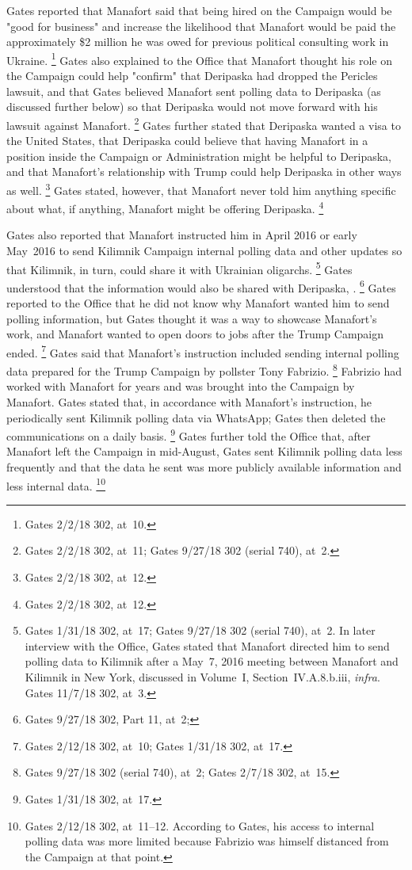 Gates reported that Manafort said that being hired on the Campaign would be "good for business" and increase the likelihood that Manafort would be paid the approximately \$2 million he was owed for previous political consulting work in Ukraine.%
\footnote{Gates 2/2/18 302, at~10.}
Gates also explained to the Office that Manafort thought his role on the Campaign could help "confirm" that Deripaska had dropped the Pericles lawsuit, and that Gates believed Manafort sent polling data to Deripaska (as discussed further below) so that Deripaska would not move forward with his lawsuit against Manafort.%
\footnote{Gates 2/2/18 302, at~11;
Gates 9/27/18 302 (serial 740), at~2.}
Gates further stated that Deripaska wanted a visa to the United States, that Deripaska could believe that having Manafort in a position inside the Campaign or Administration might be helpful to Deripaska, and that Manafort's relationship with Trump could help Deripaska in other ways as well.%
\footnote{Gates 2/2/18 302, at~12.}
Gates stated, however, that Manafort never told him anything specific about what, if anything, Manafort might be offering Deripaska.%
\footnote{Gates 2/2/18 302, at~12.}

Gates also reported that Manafort instructed him in April 2016 or early May~2016 to send Kilimnik Campaign internal polling data and other updates so that Kilimnik, in turn, could share it with Ukrainian oligarchs.%
\footnote{Gates 1/31/18 302, at~17;
Gates 9/27/18 302 (serial 740), at~2.
In later interview with the Office, Gates stated that Manafort directed him to send polling data to Kilimnik after a May~7, 2016 meeting between Manafort and Kilimnik in New York, discussed in Volume~I, Section~IV.A.8.b.iii, \textit{infra}.
Gates 11/7/18 302, at~3.}
Gates understood that the information would also be shared with Deripaska,
.%
\footnote{Gates 9/27/18 302, Part 11, at~2; }
Gates reported to the Office that he did not know why Manafort wanted him to send polling information, but Gates thought it was a way to showcase Manafort's work, and Manafort wanted to open doors to jobs after the Trump Campaign ended.%
\footnote{Gates 2/12/18 302, at~10;
Gates 1/31/18 302, at~17.}
Gates said that Manafort's instruction included sending internal polling data prepared for the Trump Campaign by pollster Tony Fabrizio.%
\footnote{Gates 9/27/18 302 (serial 740), at~2;
Gates 2/7/18 302, at~15.}
Fabrizio had worked with Manafort for years and was brought into the Campaign by Manafort.
Gates stated that, in accordance with Manafort's instruction, he periodically sent Kilimnik polling data via WhatsApp; Gates then deleted the communications on a daily basis.%
\footnote{Gates 1/31/18 302, at~17.}
Gates further told the Office that, after Manafort left the Campaign in mid-August, Gates sent Kilimnik polling data less frequently and that the data he sent was more publicly available information and less internal data.%
\footnote{Gates 2/12/18 302, at~11--12.
According to Gates, his access to internal polling data was more limited because Fabrizio was himself distanced from the Campaign at that point.}

